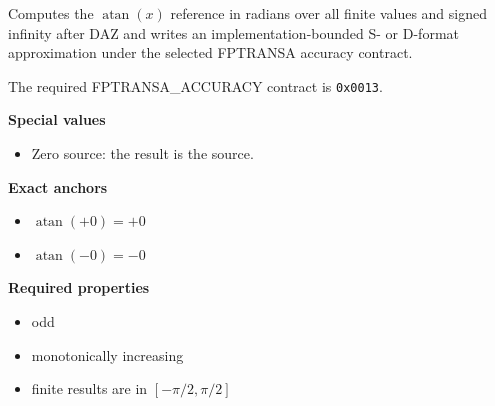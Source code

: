 Computes the $\operatorname{atan}(x)$ reference in radians over all finite values and signed infinity after DAZ and writes an implementation-bounded S- or D-format approximation under the selected FPTRANSA accuracy contract.

The required FPTRANSA\_ACCURACY contract is \texttt{0x0013}.

\textbf{Special values}\par
\begin{itemize}
\item Zero source: the result is the source.
\end{itemize}

\textbf{Exact anchors}\par
\begin{itemize}
\item $\operatorname{atan}(+0) = +0$
\item $\operatorname{atan}(-0) = -0$
\end{itemize}

\textbf{Required properties}\par
\begin{itemize}
\item odd
\item monotonically increasing
\item finite results are in $[-\pi/2, \pi/2]$
\end{itemize}
